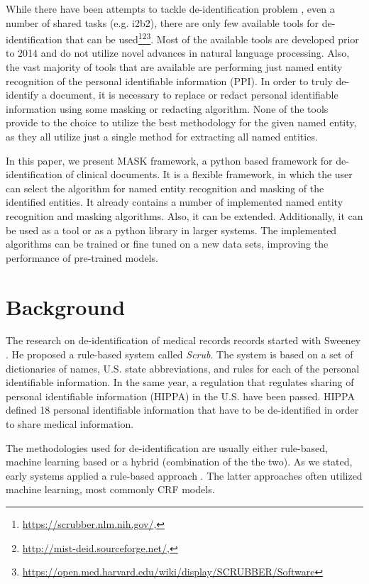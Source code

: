 \documentclass[a4paper,twoside]{article}
\begin{document}
While there have been attempts to tackle de-identification problem \cite{aberdeen2010mitre,sweeney1996replacing,stubbs2015automated}, even a number of shared tasks (e.g. i2b2), there are only few available tools for de-identification that can be used\footnote{\url{https://scrubber.nlm.nih.gov/}, }\footnote{\url{http://mist-deid.sourceforge.net/},}\footnote{\url{https://open.med.harvard.edu/wiki/display/SCRUBBER/Software}}. Most of the available tools are developed prior to 2014 and do not utilize novel advances in natural language processing. Also, the vast majority of tools that are available are performing just named entity recognition of the personal identifiable information (PPI). In order to truly de-identify a document, it is necessary to replace or redact personal identifiable information using some masking or redacting algorithm. None of the tools provide to the choice to utilize the best methodology for the given named entity, as they all utilize just a single method for extracting all named entities. 

In this paper, we present MASK framework, a python based framework for de-identification of clinical documents. It is a flexible framework, in which the user can select the algorithm for named entity recognition and masking of the identified entities. It already contains a number of implemented named entity recognition and masking algorithms. Also, it can be extended. Additionally, it can be used as a tool or as a python library in larger systems. The implemented algorithms can be trained or fine tuned on a new data sets, improving the performance of pre-trained models.



\section{Background}

The research on de-identification of medical records records started with Sweeney \cite{sweeney1996replacing}. He proposed a rule-based system called \textit{Scrub}. The system is based on a set of dictionaries of names, U.S. state abbreviations, and rules for each of the personal identifiable information. In the same year, a regulation that regulates sharing of personal identifiable information (HIPPA) in the U.S. have been passed. HIPPA defined 18 personal identifiable information that have to be de-identified in order to share medical information. 

The methodologies used for de-identification are usually either rule-based, machine learning based or a hybrid (combination of the the two). As we stated, early systems applied a rule-based approach \cite{sweeney1996replacing}. The latter approaches often utilized machine learning, most commonly CRF models.  
\end{document}
